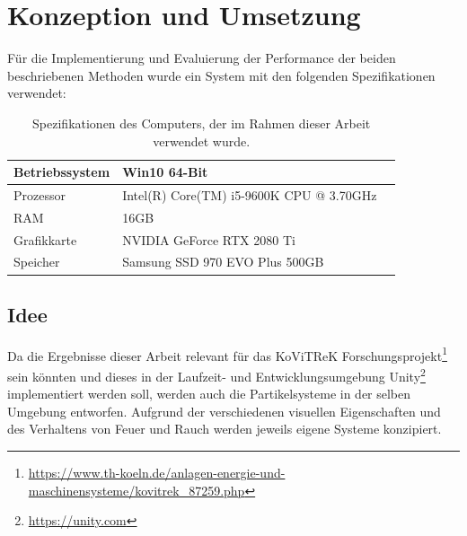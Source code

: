 \section{Konzeption und Umsetzung}
\label{sec:4}

Für die Implementierung und Evaluierung der Performance der beiden beschriebenen Methoden wurde ein System mit den folgenden Spezifikationen verwendet:

\begin{table}[h]
	\renewcommand*{\arraystretch}{2}
	\setlength{\tabcolsep}{1.5cm}
	\begin{tabular}{lll}
		\hspace{-1.5cm}Betriebssystem & Win10 64-Bit                             \\ \hline
		\hspace{-1.5cm}Prozessor      & Intel(R) Core(TM) i5-9600K CPU @ 3.70GHz \\ \hline
		\hspace{-1.5cm}RAM            & 16GB                                     \\ \hline
		\hspace{-1.5cm}Grafikkarte    & NVIDIA GeForce RTX 2080 Ti               \\ \hline
		\hspace{-1.5cm}Speicher       & Samsung SSD 970 EVO Plus 500GB           \\ \hline
	\end{tabular}
	\caption{Spezifikationen des Computers, der im Rahmen dieser Arbeit verwendet wurde.}
\end{table}

\subsection{Idee}
\label{sec:4.1}

Da die Ergebnisse dieser Arbeit relevant für das KoViTReK Forschungsprojekt\footnote{\url{https://www.th-koeln.de/anlagen-energie-und-maschinensysteme/kovitrek\_87259.php}}
sein könnten und dieses in der Laufzeit- und Entwicklungsumgebung Unity\footnote{\url{https://unity.com}}
implementiert werden soll, werden auch die Partikelsysteme in der selben Umgebung entworfen.
Aufgrund der verschiedenen visuellen Eigenschaften und des Verhaltens von Feuer und Rauch werden jeweils eigene Systeme konzipiert.

